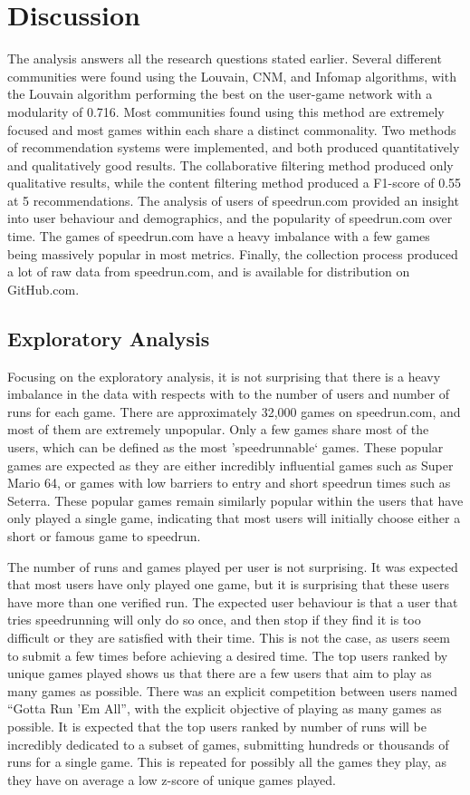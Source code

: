 \section{Discussion}


The analysis answers all the research questions stated earlier. Several different communities were found using the Louvain, CNM, and Infomap algorithms, with the Louvain algorithm performing the best on the user-game network with a modularity of 0.716. Most communities found using this method are extremely focused and most games within each share a distinct commonality. Two methods of recommendation systems were implemented, and both produced quantitatively and qualitatively good results. The collaborative filtering method produced only qualitative results, while the content filtering method produced a F1-score of 0.55 at 5 recommendations. The analysis of users of speedrun.com provided an insight into user behaviour and demographics, and the popularity of speedrun.com over time. The games of speedrun.com have a heavy imbalance with a few games being massively popular in most metrics. Finally, the collection process produced a lot of raw data from speedrun.com, and is available for distribution on GitHub.com.

\subsection{Exploratory Analysis}

Focusing on the exploratory analysis, it is not surprising that there is a heavy imbalance in the data with respects with to the number of users and number of runs for each game. There are approximately 32,000 games on speedrun.com, and most of them are extremely unpopular. Only a few games share most of the users, which can be defined as the most 'speedrunnable` games. These popular games are expected as they are either incredibly influential games such as Super Mario 64, or games with low barriers to entry and short speedrun times such as Seterra. These popular games remain similarly popular within the users that have only played a single game, indicating that most users will initially choose either a short or famous game to speedrun.


The number of runs and games played per user is not surprising. It was expected that most users have only played one game, but it is surprising that these users have more than one verified run. The expected user behaviour is that a user that tries speedrunning will only do so once, and then stop if they find it is too difficult or they are satisfied with their time. This is not the case, as users seem to submit a few times before achieving a desired time. The top users ranked by unique games played shows us that there are a few users that aim to play as many games as possible. There was an explicit competition between users named ``Gotta Run 'Em All'', with the explicit objective of playing as many games as possible. It is expected that the top users ranked by number of runs will be incredibly dedicated to a subset of games, submitting hundreds or thousands of runs for a single game. This is repeated for possibly all the games they play, as they have on average a low z-score of unique games played.


